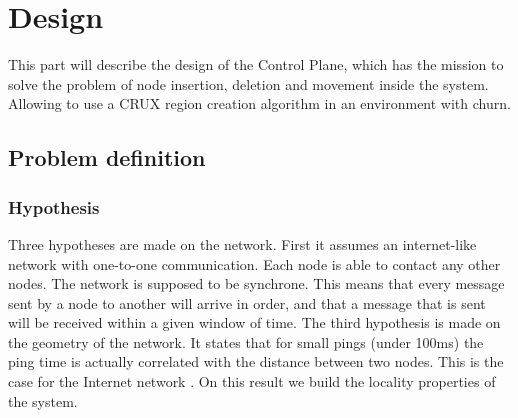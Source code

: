 \documentclass[a4paper,11pt,oneside]{report}
\begin{document}
\chapter{Design} \label{chap:Design}

This part will describe the design of the Control Plane, which has the mission
to solve the problem of node insertion, deletion and movement inside the
system. Allowing to use a CRUX region creation algorithm in an environment
with churn. 

\section{Problem definition}

\subsection{Hypothesis} Three hypotheses are made on the network. First it
assumes an internet-like network with one-to-one communication. Each node is
able to contact any other nodes. The network is supposed to be synchrone. This
means that every message sent by a node to another will arrive in order, and
that a message that is sent will be received within a given window of time. The
third hypothesis is made on the geometry of the network. It states that for
small pings (under 100ms) the ping time is actually correlated with the
distance between two nodes. This is the case for the Internet network
\cite{Seibert2014}. On this result we build the locality properties of the
system. 
\end{document}
